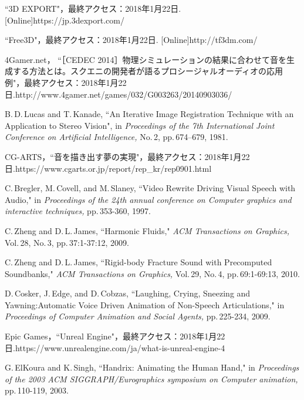\renewcommand{\refname}{参考文献}	
%
\begin{thebibliography}{55}
%
``3D EXPORT"，最終アクセス：2018年1月22日.
[Online]https://jp.3dexport.com/

``Free3D"，最終アクセス：2018年1月22日.
[Online]http://tf3dm.com/

4Gamer.net，
``［CEDEC 2014］物理シミュレーションの結果に合わせて音を生成する方法とは。スクエニの開発者が語るプロシージャルオーディオの応用例"，最終アクセス：2018年1月22日.\newline
[Online]http://www.4gamer.net/games/032/G003263/20140903036/

B.\,D.\,Lucas and T.\,Kanade,
 ``An Iterative Image Registration Technique with an Application to Stereo Vision",
 in \textit{Proceedings of the 7th International Joint Conference on Artificial Intelligence,} No.\,2, pp.\,674--679, 1981.

CG-ARTS，``音を描き出す夢の実現"，最終アクセス：2018年1月22日.\newline
[Online]https://www.cgarts.or.jp/report/rep\_kr/rep0901.html

C.\,Bregler, M.\,Covell, and M.\,Slaney,
 ``Video Rewrite Driving Visual Speech with Audio,"
 in \textit{Proceedings of the 24th annual conference on Computer graphics and interactive techniques,} pp.\,353-360, 1997.

C.\,Zheng and D.\,L.\,James,
``Harmonic Fluids,"
\textit{ACM Transactions on Graphics,} Vol.\,28, No.\,3, pp.\,37:1-37:12, 2009.

C.\,Zheng and D.\,L.\,James,
``Rigid-body Fracture Sound with Precomputed Soundbanks,"
\textit{ACM Transactions on Graphics,} Vol.\,29, No.\,4, pp.\,69:1-69:13, 2010.

D.\,Cosker, J.\,Edge, and D.\,Cobzas,
 ``Laughing, Crying, Sneezing and Yawning:Automatic Voice Driven Animation of Non-Speech Articulations,"
 in \textit{Proceedings of Computer Animation and Social Agents,} pp.\,225-234, 2009.

Epic Games，``Unreal Engine"，最終アクセス：2018年1月22日.\newline
[Online]https://www.unrealengine.com/ja/what-is-unreal-engine-4

G.\,ElKoura and K.\,Singh,
 ``Handrix: Animating the Human Hand,"
  in \textit{Proceedings of the 2003 ACM SIGGRAPH/Eurographics symposium on Computer animation,}
  pp.\,110-119, 2003.


\end{thebibliography}
